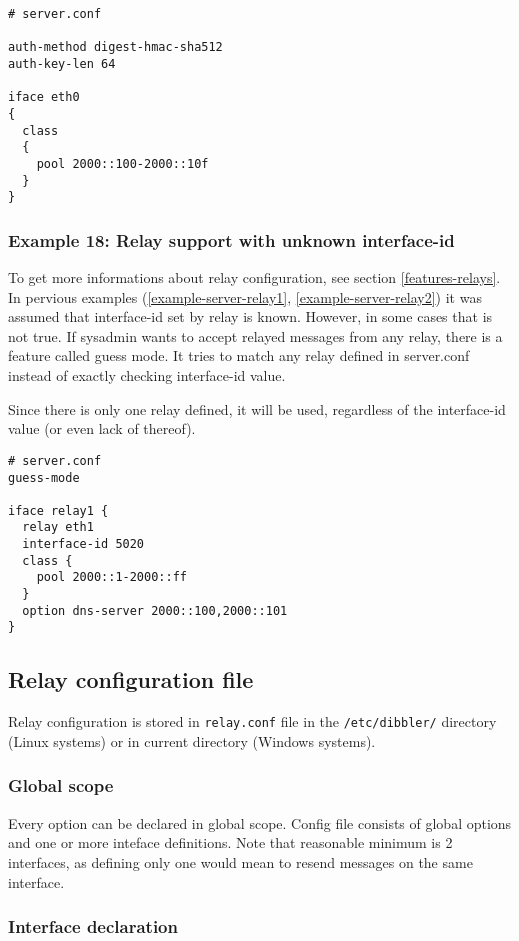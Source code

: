 \begin{lstlisting}
# server.conf

auth-method digest-hmac-sha512
auth-key-len 64

iface eth0
{ 
  class
  {
    pool 2000::100-2000::10f
  } 
}
\end{lstlisting}

\subsubsection{Example 18: Relay support with unknown interface-id}
\label{example-server-relay3}
To get more informations about relay configuration, see section \ref{features-relays}.
In pervious examples (\ref{example-server-relay1},
\ref{example-server-relay2}) it was assumed that interface-id set by
relay is known. However, in some cases that is not true. If sysadmin
wants to accept relayed messages from any relay, there is a feature
called guess mode. It tries to match any relay defined in server.conf
instead of exactly checking interface-id value.

Since there is only one relay defined, it will be used, regardless of
the interface-id value (or even lack of thereof).

\begin{lstlisting}
# server.conf
guess-mode

iface relay1 {
  relay eth1
  interface-id 5020
  class {
    pool 2000::1-2000::ff
  }
  option dns-server 2000::100,2000::101
}
\end{lstlisting}


\subsection{Relay configuration file}
\label{relay-conf}
Relay configuration is stored in \verb+relay.conf+ file in the
\verb+/etc/dibbler/+ directory (Linux systems) or in current directory
(Windows systems).

\subsubsection{Global scope}

Every option can be declared in global scope.
Config file consists of global options and one or more inteface
definitions. Note that reasonable minimum is 2 interfaces, as defining
only one would mean to resend messages on the same interface.

\subsubsection{Interface declaration}

